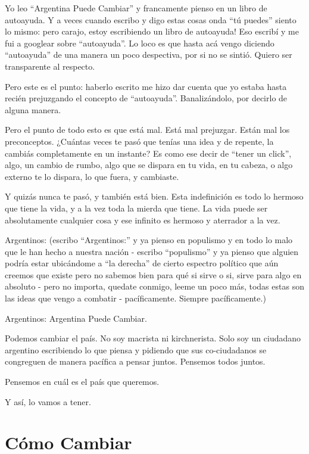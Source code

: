 \documentclass[
]{book}
\begin{document}
Yo leo ``Argentina Puede Cambiar'' y francamente pienso en un libro de autoayuda. Y a veces cuando escribo y digo estas cosas onda ``tú puedes'' siento lo mismo: pero carajo, estoy escribiendo un libro de autoayuda! Eso escribí y me fui a googlear sobre ``autoayuda''. Lo loco es que hasta acá vengo diciendo ``autoayuda'' de una manera un poco despectiva, por si no se sintió. Quiero ser transparente al respecto.

Pero este es el punto: haberlo escrito me hizo dar cuenta que yo estaba hasta recién prejuzgando el concepto de ``autoayuda''. Banalizándolo, por decirlo de alguna manera.

Pero el punto de todo esto es que está mal. Está mal prejuzgar. Están mal los preconceptos. ¿Cuántas veces te pasó que tenías una idea y de repente, la cambiás completamente en un instante? Es como ese decir de ``tener un click'', algo, un cambio de rumbo, algo que se dispara en tu vida, en tu cabeza, o algo externo te lo dispara, lo que fuera, y cambiaste.

Y quizás nunca te pasó, y también está bien. Esta indefinición es todo lo hermoso que tiene la vida, y a la vez toda la mierda que tiene. La vida puede ser absolutamente cualquier cosa y ese infinito es hermoso y aterrador a la vez.

Argentinos: (escribo ``Argentinos:'' y ya pienso en populismo y en todo lo malo que le han hecho a nuestra nación - escribo ``populismo'' y ya pienso que alguien podría estar ubicándome a ``la derecha'' de cierto espectro político que aún creemos que existe pero no sabemos bien para qué si sirve o si, sirve para algo en absoluto - pero no importa, quedate conmigo, leeme un poco más, todas estas son las ideas que vengo a combatir - pacíficamente. Siempre pacíficamente.)

Argentinos: Argentina Puede Cambiar.

Podemos cambiar el país. No soy macrista ni kirchnerista. Solo soy un ciudadano argentino escribiendo lo que piensa y pidiendo que sus co-ciudadanos se congreguen de manera pacífica a pensar juntos. Pensemos todos juntos.

Pensemos en cuál es el país que queremos.

Y así, lo vamos a tener.

\hypertarget{cuxf3mo-cambiar}{%
\section{Cómo Cambiar}\label{cuxf3mo-cambiar}}
\end{document}

